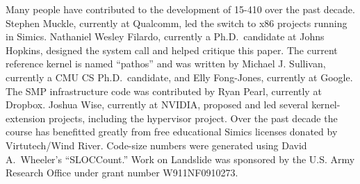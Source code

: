 Many people have contributed to the development of
15-410 over the past decade.
Stephen Muckle, currently at Qualcomm, led
the switch to x86 projects running in Simics.
Nathaniel Wesley Filardo,
currently a Ph.D.\ candidate at Johns Hopkins,
designed the  system call and helped critique this paper.
The current reference kernel is named ``pathos''
and was written by Michael J. Sullivan,
currently a CMU CS Ph.D.\ candidate,
and Elly Fong-Jones, currently at Google.
The SMP infrastructure code was contributed by
Ryan Pearl, currently at Dropbox.
Joshua Wise, currently at NVIDIA,
proposed and led several kernel-extension projects,
including the hypervisor project.
Over the past decade the course has benefitted
greatly from free educational Simics licenses
donated by Virtutech/Wind River.
Code-size numbers were generated using David A.\ Wheeler's
``SLOCCount.''
Work on Landslide was sponsored by the U.S. Army Research Office under grant number W911NF0910273.
